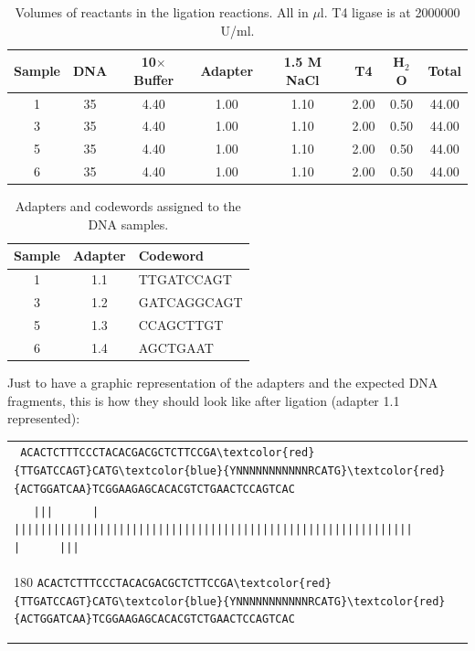 \documentclass[a4paper,12pt]{article}
\begin{document}
\begin{table}
\caption{Volumes of reactants in the ligation reactions. All in $\mu$l. T4 ligase is at 2000000 U/ml.}\label{tau:ligation}
\vspace*{0.2cm}
\begin{tabular}{cccccccc}
\toprule
Sample&DNA&10$\times$ Buffer&Adapter&1.5 M NaCl&T4&H$_2$O&Total\\
\midrule
1&35&4.40&1.00&1.10&2.00&0.50&44.00\\
3&35&4.40&1.00&1.10&2.00&0.50&44.00\\
5&35&4.40&1.00&1.10&2.00&0.50&44.00\\
6&35&4.40&1.00&1.10&2.00&0.50&44.00\\
\bottomrule
\end{tabular}
\end{table}

\begin{table}
\begin{center}
\caption{Adapters and codewords assigned to the DNA samples.}\label{tau:codewords}
\vspace*{0.2cm}
\begin{tabular}{ccl}
\toprule
Sample&Adapter&Codeword\\
\midrule
1&1.1&TTGATCCAGT\\
3&1.2&GATCAGGCAGT\\
5&1.3&CCAGCTTGT\\
6&1.4&AGCTGAAT\\
\bottomrule
\end{tabular}
\end{center}
\end{table}

Just to have a graphic representation of the adapters and the expected DNA fragments, this is how they should look like after ligation (adapter 1.1 represented):
\begin{flushleft}
\begin{tabular}{l}
   \Verb+ ACACTCTTTCCCTACACGACGCTCTTCCGA\textcolor{red}{TTGATCCAGT}CATG\textcolor{blue}{YNNNNNNNNNNNRCATG}\textcolor{red}{ACTGGATCAA}TCGGAAGAGCACACGTCTGAACTCCAGTCAC+\\[-4pt]
   \Verb+   |||      |        |||||||||||||||||||||||||||||||||||||||||||||||||||||||||||||        |      |||+\\[-10pt]
   \begin{turn}{180}
      \Verb+ACACTCTTTCCCTACACGACGCTCTTCCGA\textcolor{red}{TTGATCCAGT}CATG\textcolor{blue}{YNNNNNNNNNNNRCATG}\textcolor{red}{ACTGGATCAA}TCGGAAGAGCACACGTCTGAACTCCAGTCAC+
   \end{turn}
\\
\end{tabular}
\end{flushleft}
\end{document}
